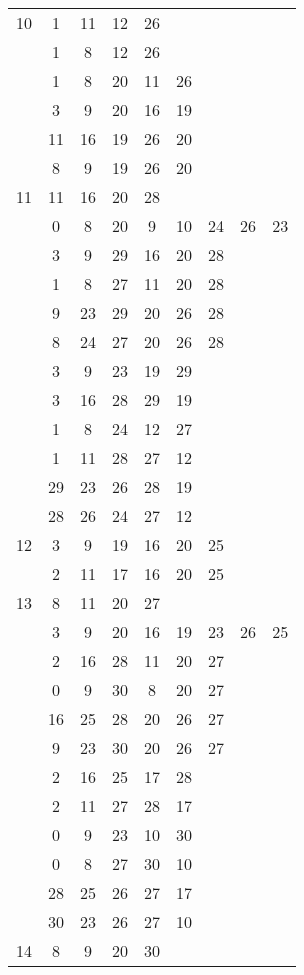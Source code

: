\begin{table}[H]
\begin{tabular}{|c|cccccccc|}
\hline
10  & 1 & 11 & 12 & 26 &   &   &   &  \\
 & 1 & 8 & 12 & 26 &   &   &   &  \\
 & 1 & 8 & 20 & 11 & 26 &   &   &  \\
 & 3 & 9 & 20 & 16 & 19 &   &   &  \\
 & 11 & 16 & 19 & 26 & 20 &   &   &  \\
 & 8 & 9 & 19 & 26 & 20 &   &   &  \\
\hline
11  & 11 & 16 & 20 & 28 &   &   &   &  \\
 & 0 & 8 & 20 & 9 & 10 & 24 & 26 & 23\\
 & 3 & 9 & 29 & 16 & 20 & 28 &   &  \\
 & 1 & 8 & 27 & 11 & 20 & 28 &   &  \\
 & 9 & 23 & 29 & 20 & 26 & 28 &   &  \\
 & 8 & 24 & 27 & 20 & 26 & 28 &   &  \\
 & 3 & 9 & 23 & 19 & 29 &   &   &  \\
 & 3 & 16 & 28 & 29 & 19 &   &   &  \\
 & 1 & 8 & 24 & 12 & 27 &   &   &  \\
 & 1 & 11 & 28 & 27 & 12 &   &   &  \\
 & 29 & 23 & 26 & 28 & 19 &   &   &  \\
 & 28 & 26 & 24 & 27 & 12 &   &   &  \\
\hline
12  & 3 & 9 & 19 & 16 & 20 & 25 &   &  \\
 & 2 & 11 & 17 & 16 & 20 & 25 &   &  \\
\hline
13  & 8 & 11 & 20 & 27 &   &   &   &  \\
 & 3 & 9 & 20 & 16 & 19 & 23 & 26 & 25\\
 & 2 & 16 & 28 & 11 & 20 & 27 &   &  \\
 & 0 & 9 & 30 & 8 & 20 & 27 &   &  \\
 & 16 & 25 & 28 & 20 & 26 & 27 &   &  \\
 & 9 & 23 & 30 & 20 & 26 & 27 &   &  \\
 & 2 & 16 & 25 & 17 & 28 &   &   &  \\
 & 2 & 11 & 27 & 28 & 17 &   &   &  \\
 & 0 & 9 & 23 & 10 & 30 &   &   &  \\
 & 0 & 8 & 27 & 30 & 10 &   &   &  \\
 & 28 & 25 & 26 & 27 & 17 &   &   &  \\
 & 30 & 23 & 26 & 27 & 10 &   &   &  \\
\hline
14  & 8 & 9 & 20 & 30 &   &   &   &  \\

\end{tabular}
\end{table}
